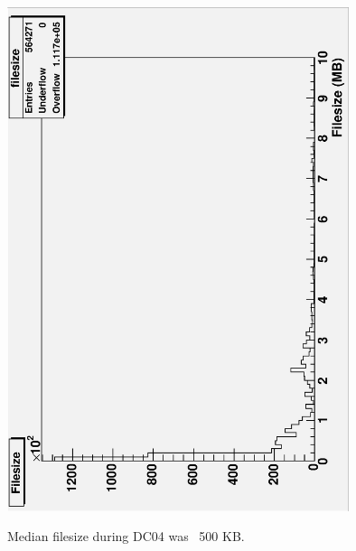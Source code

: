 \documentclass{cmspaper}
\begin{document}
\clearpage
\begin{figure}[tbp]
\centering
\includegraphics[width=10cm, angle=-90]{filesizes.eps}
\label{fig:filesizes}
\caption{Median filesize during DC04 was ~500 KB.}
\end{figure}
\end{document}
